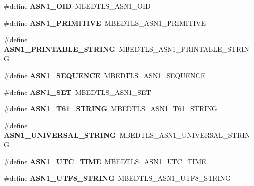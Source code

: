 \begin{DoxyCompactItemize}
\#define {\bfseries A\+S\+N1\+\_\+\+O\+ID}~M\+B\+E\+D\+T\+L\+S\+\_\+\+A\+S\+N1\+\_\+\+O\+ID
\item 
\mbox{\label{compat-1_83_8h_ad61fcc873df5268453d3064aa11ffbca}} 
\#define {\bfseries A\+S\+N1\+\_\+\+P\+R\+I\+M\+I\+T\+I\+VE}~M\+B\+E\+D\+T\+L\+S\+\_\+\+A\+S\+N1\+\_\+\+P\+R\+I\+M\+I\+T\+I\+VE
\item 
\mbox{\label{compat-1_83_8h_a9d250073c32cfa2d0f90a92fa9485c89}} 
\#define {\bfseries A\+S\+N1\+\_\+\+P\+R\+I\+N\+T\+A\+B\+L\+E\+\_\+\+S\+T\+R\+I\+NG}~M\+B\+E\+D\+T\+L\+S\+\_\+\+A\+S\+N1\+\_\+\+P\+R\+I\+N\+T\+A\+B\+L\+E\+\_\+\+S\+T\+R\+I\+NG
\item 
\mbox{\label{compat-1_83_8h_a9321fc9f2a5ef4103008fbe5c4b230df}} 
\#define {\bfseries A\+S\+N1\+\_\+\+S\+E\+Q\+U\+E\+N\+CE}~M\+B\+E\+D\+T\+L\+S\+\_\+\+A\+S\+N1\+\_\+\+S\+E\+Q\+U\+E\+N\+CE
\item 
\mbox{\label{compat-1_83_8h_aaa4097914560e5318d1c316106b38998}} 
\#define {\bfseries A\+S\+N1\+\_\+\+S\+ET}~M\+B\+E\+D\+T\+L\+S\+\_\+\+A\+S\+N1\+\_\+\+S\+ET
\item 
\mbox{\label{compat-1_83_8h_aecb31acd8c2e58371f4cc5163f13ee3e}} 
\#define {\bfseries A\+S\+N1\+\_\+\+T61\+\_\+\+S\+T\+R\+I\+NG}~M\+B\+E\+D\+T\+L\+S\+\_\+\+A\+S\+N1\+\_\+\+T61\+\_\+\+S\+T\+R\+I\+NG
\item 
\mbox{\label{compat-1_83_8h_a7571a2e3383313e9a36cf168b707b4f9}} 
\#define {\bfseries A\+S\+N1\+\_\+\+U\+N\+I\+V\+E\+R\+S\+A\+L\+\_\+\+S\+T\+R\+I\+NG}~M\+B\+E\+D\+T\+L\+S\+\_\+\+A\+S\+N1\+\_\+\+U\+N\+I\+V\+E\+R\+S\+A\+L\+\_\+\+S\+T\+R\+I\+NG
\item 
\mbox{\label{compat-1_83_8h_a94a96a45489af8cb19d6dd3ee76eefb2}} 
\#define {\bfseries A\+S\+N1\+\_\+\+U\+T\+C\+\_\+\+T\+I\+ME}~M\+B\+E\+D\+T\+L\+S\+\_\+\+A\+S\+N1\+\_\+\+U\+T\+C\+\_\+\+T\+I\+ME
\item 
\mbox{\label{compat-1_83_8h_a0dcba566de60f1776d36931ac1733b8d}} 
\#define {\bfseries A\+S\+N1\+\_\+\+U\+T\+F8\+\_\+\+S\+T\+R\+I\+NG}~M\+B\+E\+D\+T\+L\+S\+\_\+\+A\+S\+N1\+\_\+\+U\+T\+F8\+\_\+\+S\+T\+R\+I\+NG
\item 

\end{DoxyCompactItemize}
